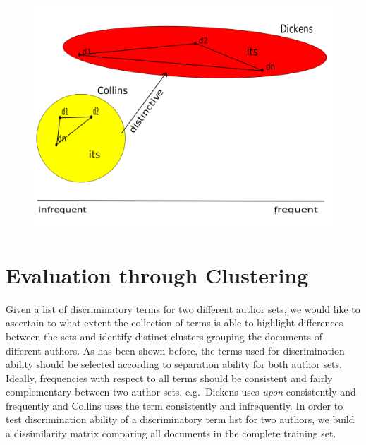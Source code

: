 \documentclass[a4paper,10pt,twoside,fleqn]{article}
\begin{document}
\begin{figure}[!htb]
  \includegraphics[scale=0.2,width=\linewidth]{figures/distinc2-fin.png}
 \endminipage
\end{figure}
 

\section{Evaluation through Clustering} \label{sec:evaluation}

Given a list of discriminatory terms for two different author sets, we would like to ascertain to what extent the collection of terms is able to 
highlight differences between the sets and identify distinct clusters grouping the documents of different authors. 
As has been shown before, the terms used for discrimination ability should be selected according to separation ability for both author sets. 
Ideally, frequencies with respect to all terms should be consistent and fairly complementary between two author sets, e.g.~Dickens uses \emph{upon} 
consistently and frequently and Collins uses the term consistently and infrequently. 
In order to test discrimination ability of a discriminatory term list for two authors, we build a dissimilarity matrix comparing all documents in 
the complete training set. 
\end{document}
